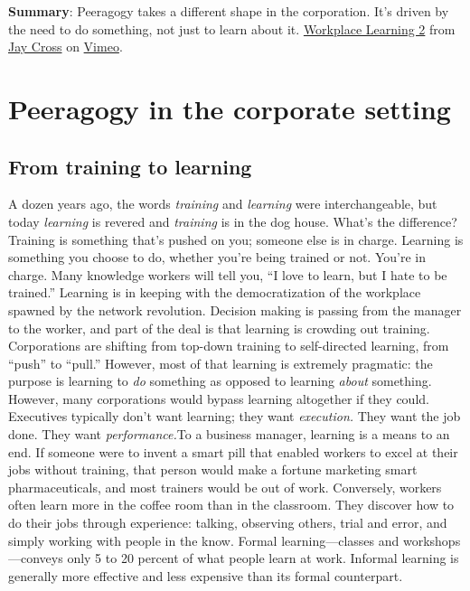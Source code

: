 \textbf{Summary}: Peeragogy takes a different shape in the corporation.
It's driven by the need to do something, not just to learn about it.
\href{http://vimeo.com/45989903}{Workplace Learning 2} from
\href{http://vimeo.com/user7021511}{Jay Cross} on
\href{http://vimeo.com}{Vimeo}.

\section{Peeragogy in the corporate setting}

\subsection{From training to learning}

A dozen years ago, the words \emph{training} and \emph{learning} were
interchangeable, but today \emph{learning} is revered and
\emph{training} is in the dog house. What's the difference? Training is
something that's pushed on you; someone else is in charge. Learning is
something you choose to do, whether you're being trained or not. You're
in charge. Many knowledge workers will tell you, ``I love to learn, but
I hate to be trained.'' Learning is in keeping with the democratization
of the workplace spawned by the network revolution. Decision making is
passing from the manager to the worker, and part of the deal is that
learning is crowding out training. Corporations are shifting from
top-down training to self-directed learning, from ``push'' to ``pull.''
However, most of that learning is extremely pragmatic: the purpose is
learning to \emph{do} something as opposed to learning \emph{about}
something. However, many corporations would bypass learning altogether
if they could. Executives typically don't want learning; they want
\emph{execution.} They want the job done. They want
\emph{performance.}To a business manager, learning is a means to an end.
If someone were to invent a smart pill that enabled workers to excel at
their jobs without training, that person would make a fortune marketing
smart pharmaceuticals, and most trainers would be out of work.
Conversely, workers often learn more in the coffee room than in the
classroom. They discover how to do their jobs through experience:
talking, observing others, trial and error, and simply working with
people in the know. Formal learning---classes and workshops---conveys
only 5 to 20 percent of what people learn at work. Informal learning is
generally more effective and less expensive than its formal counterpart.

